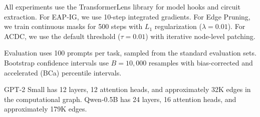 \documentclass[11pt,a4paper]{article}
\begin{document}
All experiments use the TransformerLens library for model hooks and circuit extraction. For EAP-IG, we use 10-step integrated gradients. For Edge Pruning, we train continuous masks for 500 steps with $L_1$ regularization ($\lambda=0.01$). For ACDC, we use the default threshold ($\tau=0.01$) with iterative node-level patching.

Evaluation uses 100 prompts per task, sampled from the standard evaluation sets. Bootstrap confidence intervals use $B=10{,}000$ resamples with bias-corrected and accelerated (BCa) percentile intervals.

GPT-2 Small has 12 layers, 12 attention heads, and approximately 32K edges in the computational graph. Qwen-0.5B has 24 layers, 16 attention heads, and approximately 179K edges.
\end{document}
